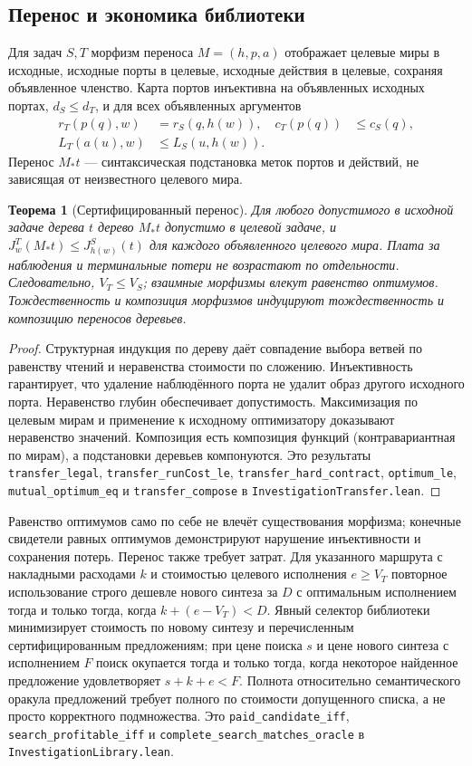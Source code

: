\documentclass[10pt,a4paper]{article}
\newtheorem{theorem}{Теорема}[section]
\newcommand{\rc}[1]{\allowbreak\texttt{#1}\allowbreak}
\begin{document}
\subsection{Перенос и экономика библиотеки}
Для задач $S,T$ морфизм переноса $M=(h,p,a)$ отображает целевые миры в исходные, исходные порты в целевые, исходные действия в целевые, сохраняя объявленное членство. Карта портов инъективна на объявленных исходных портах, $d_S\le d_T$, и для всех объявленных аргументов
\begin{align*}
 r_T(p(q),w)&=r_S(q,h(w)), & c_T(p(q))&\le c_S(q),\\
 L_T(a(u),w)&\le L_S(u,h(w)).
\end{align*}
Перенос $M_*t$ --- синтаксическая подстановка меток портов и действий, не зависящая от неизвестного целевого мира.
\begin{theorem}[Сертифицированный перенос]\label{thm:transfer}
Для любого допустимого в исходной задаче дерева $t$ дерево $M_*t$ допустимо в целевой задаче, и $J^T_w(M_*t)\le J^S_{h(w)}(t)$ для каждого объявленного целевого мира. Плата за наблюдения и терминальные потери не возрастают по отдельности. Следовательно, $V_T\le V_S$; взаимные морфизмы влекут равенство оптимумов. Тождественность и композиция морфизмов индуцируют тождественность и композицию переносов деревьев.
\end{theorem}
\begin{proof}
Структурная индукция по дереву даёт совпадение выбора ветвей по равенству чтений и неравенства стоимости по сложению. Инъективность гарантирует, что удаление наблюдённого порта не удалит образ другого исходного порта. Неравенство глубин обеспечивает допустимость. Максимизация по целевым мирам и применение к исходному оптимизатору доказывают неравенство значений. Композиция есть композиция функций (контравариантная по мирам), а подстановки деревьев компонуются. Это результаты \rc{transfer\_legal}, \rc{transfer\_runCost\_le}, \rc{transfer\_hard\_contract}, \rc{optimum\_le}, \rc{mutual\_optimum\_eq} и \rc{transfer\_compose} в \rc{InvestigationTransfer.lean}.
\end{proof}
Равенство оптимумов само по себе не влечёт существования морфизма; конечные свидетели равных оптимумов демонстрируют нарушение инъективности и сохранения потерь. Перенос также требует затрат. Для указанного маршрута с накладными расходами $k$ и стоимостью целевого исполнения $e\ge V_T$ повторное использование строго дешевле нового синтеза за $D$ с оптимальным исполнением тогда и только тогда, когда $k+(e-V_T)<D$. Явный селектор библиотеки минимизирует стоимость по новому синтезу и перечисленным сертифицированным предложениям; при цене поиска $s$ и цене нового синтеза с исполнением $F$ поиск окупается тогда и только тогда, когда некоторое найденное предложение удовлетворяет $s+k+e<F$. Полнота относительно семантического оракула предложений требует полного по стоимости допущенного списка, а не просто корректного подмножества. Это \rc{paid\_candidate\_iff}, \rc{search\_profitable\_iff} и \rc{complete\_search\_matches\_oracle} в \rc{InvestigationLibrary.lean}.
\end{document}
